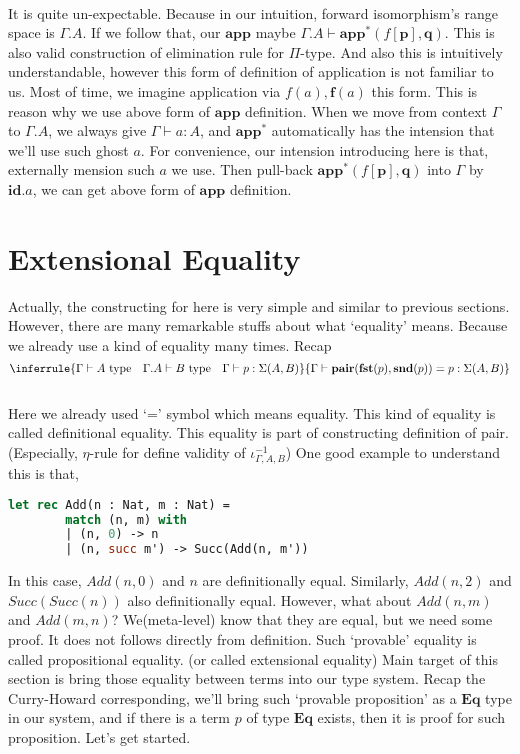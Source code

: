 \documentclass[12pt, a4paper, openany, twoside]{book}
\theoremstyle{definition}
\theoremstyle{remark}
\theoremstyle{plain}
\numberwithin{equation}{section}
\begin{document}
\\
It is quite un-expectable. Because in our intuition, forward isomorphism's range space is $\Gamma.A$. 
If we follow that, our $\mathbf{app}$ maybe $\Gamma.A \vdash \mathbf{app}^*(f[\mathbf{p}], \mathbf{q})$. 
This is also valid construction of elimination rule for $\Pi$-type. And also this is intuitively understandable, 
however this form of definition of application is not familiar to us. Most of time, we imagine 
application via $f(a), \mathbf{f}(a)$ this form. This is reason why we use above form of $\mathbf{app}$ definition. 
When we move from context $\Gamma$ to $\Gamma.A$, we always give $\Gamma \vdash a : A$, and $\mathbf{app}^*$ automatically 
has the intension that we'll use such ghost $a$. For convenience, our intension introducing here is that, externally 
mension such $a$ we use. Then pull-back $\mathbf{app}^*(f[\mathbf{p}], \mathbf{q})$ into $\Gamma$ by $\mathbf{id}.a$, 
we can get above form of $\mathbf{app}$ definition. 

\newpage  

\section{Extensional Equality}

Actually, the constructing for here is very simple and similar to previous sections. However, there are many 
remarkable stuffs about what \lq equality' means. Because we already use a kind of equality many times. Recap 
\[
\inferrule
{
    \Gamma \vdash A \text{ type} \quad \Gamma.A \vdash B \text{ type} \quad \Gamma \vdash p : \Sigma(A, B)
}
{
    \Gamma \vdash \mathbf{pair}(\mathbf{fst}(p), \mathbf{snd}(p)) = p : \Sigma(A, B)
}
\]
\\
Here we already used \lq =' symbol which means equality. This kind of equality is called definitional equality. 
This equality is part of constructing definition of pair. (Especially, $\eta$-rule for define validity of $\iota^{-1}_{\Gamma, A, B}$) 
One good example to understand this is that, 

\begin{lstlisting}[language=Caml, caption={Add in Peano Arithmetic}, label={lst:ocaml}]
    let rec Add(n : Nat, m : Nat) = 
        match (n, m) with 
        | (n, 0) -> n 
        | (n, succ m') -> Succ(Add(n, m'))
\end{lstlisting}
\vspace{4mm}
In this case, $Add(n, 0)$ and $n$ are definitionally equal. Similarly, $Add(n, 2)$ and $Succ(Succ(n))$ also definitionally equal. 
However, what about $Add(n, m)$ and $Add(m, n)$? We(meta-level) know that they are equal, but we need some proof. 
It does not follows directly from definition. Such \lq provable' equality is called propositional equality. (or called extensional equality) 
Main target of this section is bring those equality between terms into our type system. Recap the Curry-Howard corresponding, 
we'll bring such \lq provable proposition' as a $\mathbf{Eq}$ type in our system, and if there is a term $p$ 
of type $\mathbf{Eq}$ exists, then it is proof for such proposition. Let's get started. 
\end{document}
